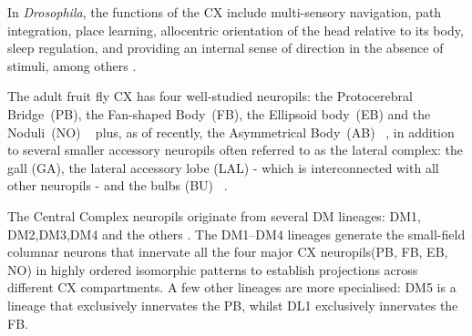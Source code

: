         In \textit{Drosophila}, the functions of the CX include multi-sensory navigation, path integration, place learning, allocentric orientation of the head relative to its body, sleep regulation, and providing an internal sense of direction in the absence of stimuli, among others \citep{hanesch1989neuronal, ofstad2011visual, seelig2013feature, PfeifferHomberg2014, Stone2017CXModel, franconville2018building, heinze2018principles, szuperak2018sleep, pisokas2020head, ShaferKeene2021sleep, fisher2022flexible}.

        The adult fruit fly CX has four well-studied neuropils: the Protocerebral Bridge~(PB), the Fan-shaped Body~(FB), the Ellipsoid body~(EB) and the Noduli~(NO) ~\citep{hanesch1989neuronal} plus, as of recently, the Asymmetrical Body~(AB) ~\citep{wolff2018neuroarchitecture}, in addition to several smaller accessory neuropils often referred to as the lateral complex: the gall (GA), the lateral accessory lobe (LAL) - which is interconnected with all other neuropils -  and the bulbs (BU)  ~\citep{wolff2015neuroarchitecture, franconville2018building, hulse2021connectome}. 
        


        The Central Complex neuropils originate from several DM lineages: DM1, DM2,DM3,DM4 and the others \citep{yang2013diverse,andrade2019developmentally}. %
        The DM1–DM4 lineages generate the small-field columnar neurons that innervate all the four major CX neuropils(PB, FB, EB, NO) in highly ordered isomorphic patterns to establish projections across different CX compartments. 
        A few other lineages are more specialised: DM5 is a lineage that exclusively innervates the PB, whilst DL1  exclusively innervates the FB. 

